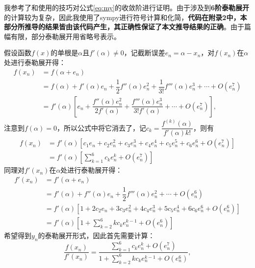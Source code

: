 我参考了\cite{kou2006modified}和\cite{eftekhari2014new}使用的技巧对公式\ref{eq:my}的收敛阶进行证明。由于涉及到\textbf{6阶泰勒展开}的计算较为复杂，因此我使用了sympy\footnotemark[1]进行符号计算和化简，\textbf{代码在附录2中，本部分所推导的结果皆由该代码产生，其正确性保证了本文推导结果的正确}。由于篇幅有限，部分泰勒展开用省略号表示。

假设函数$f(x)$的单根是$\alpha$且$f'(\alpha)\neq 0$，记截断误差$e_n = \alpha - x_n$，对$f(x_n)$在$\alpha$处进行泰勒展开得：
\begin{equation}
    \label{eq:fx-taylor}
    \begin{aligned}
        f(x_n) &= f(\alpha + e_n) \\
        &= f(\alpha) + f'(\alpha)e_n + \dfrac{1}{2}f''(\alpha)e_n^2+\dfrac{1}{3!}f'''(\alpha)e_n^3+ \cdots + O(e_n^7) \\
        &= f'(\alpha)\left[e_n + \dfrac{f''(\alpha)e_n^2}{2f'(\alpha)}+\dfrac{f'''(\alpha)e_n^3}{3!f'(\alpha)} + \cdots + O(e_n^7) \right],
    \end{aligned}
\end{equation}
注意到$f(\alpha)=0$，所以公式中将它消去了，记$c_k=\dfrac{f^{(k)}(\alpha)}{f'(\alpha)k!}$，则有
\begin{equation}
    \begin{aligned}
        f(x_n) &= f'(\alpha)\left[c_1e_n + c_2e_n^2 + c_3e_n^3 + c_4e_n^4 + c_5e_n^5 + c_6e_n^6 + O(e_n^7)\right] \\
        &= f'(\alpha)\left[ \sum\limits_{k=1}^6 c_ke_n^k + O(e_n^7) \right]
    \end{aligned}
\end{equation}
同理对$f'(x_n)$在$\alpha$处进行泰勒展开得：
\begin{equation}
    \label{eq:dx}
    \begin{aligned}
        f'(x_n) &= f'(\alpha + e_n)\\
        &= f'(\alpha) + f''(\alpha)e_n + \dfrac{1}{2}f'''(\alpha)e_n^2 + \cdots + O(e_n^6) \\
        &=f'(\alpha) [1 + 2c_2e_n + 3c_3e_n^2 + 4c_4e_n^3 + 5c_5e_n^4 + 6c_6e_n^6 + O(e_n^6)] \\
        &= f'(\alpha) \left[ 1 + \sum\limits_{k=2}^6 kc_ke_n^{k-1} + O(e_n^6) \right]
    \end{aligned}
\end{equation}
希望得到$y_n$的泰勒展开形式，因此首先需要计算：
\begin{equation}
    \label{eq:fx-div-dx}
    \dfrac{f(x_n)}{f'(x_n)} = \dfrac{\sum\limits_{k=1}^6 c_ke_n^k + O(e_n^7)}{1 + \sum\limits_{k=2}^6 kc_ke_n^{k-1} + O(e_n^6) },
\end{equation}
